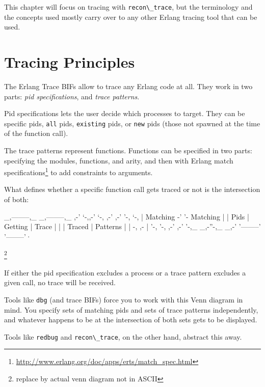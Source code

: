 \documentclass[11pt, oneside]{book}   	%
\newcommand{\otpapp}[1]{\Verb`#1`}
\newcommand{\module}[1]{\Verb`#1`}
\newcommand{\expression}[1]{\Verb`#1`}
\begin{document}
This chapter will focus on tracing with \module{recon\_trace}, but the terminology and the concepts used mostly carry over to any other Erlang tracing tool that can be used.

\section{Tracing Principles}
\label{sec:tracing-princples}

The Erlang Trace BIFs allow to trace any Erlang code at all. They work in two parts: \emph{pid specifications}, and \emph{trace patterns}.

Pid specifications lets the user decide which processes to target. They can be specific pids, \expression{all} pids, \expression{existing} pids, or \expression{new} pids (those not spawned at the time of the function call).

The trace patterns represent functions. Functions can be specified in two parts: specifying the modules, functions, and arity, and then with Erlang match specifications\footnote{\href{http://www.erlang.org/doc/apps/erts/match\_spec.html}{http://www.erlang.org/doc/apps/erts/match\_spec.html}} to add constraints to arguments.

What defines whether a specific function call gets traced or not is the intersection of both:

\begin{VerbatimText}
        _,--------,_      _,--------,_
     ,-'            `-,,-'            `-,
  ,-'              ,-'  '-,              `-,
 |   Matching    -'        '-   Matching    |
 |     Pids     |  Getting   |    Trace     |
 |              |   Traced   |  Patterns    |
 |               -,        ,-               |
  '-,              '-,  ,-'              ,-'
     '-,_          _,-''-,_          _,-'
         '--------'        '--------'·
\end{VerbatimText}
\footnote{replace by actual venn diagram not in ASCII}

If either the pid specification excludes a process or a trace pattern excludes a given call, no trace will be received.

Tools like \otpapp{dbg} (and trace BIFs) force you to work with this Venn diagram in mind. You specify sets of matching pids and sets of trace patterns independently, and whatever happens to be at the intersection of both sets gets to be displayed.

Tools like \otpapp{redbug} and \module{recon\_trace}, on the other hand, abstract this away.
\end{document}
